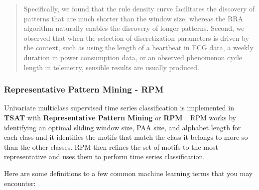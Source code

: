 \documentclass[letterpaper, 12pt]{article}
\newcommand\TSAT{\textbf{TSAT}}
\begin{document}
\begin{quote}
	Specifically, we found that the rule density curve facilitates the discovery of patterns that are much shorter than the window size, whereas the RRA algorithm naturally enables the discovery of longer patterns. Second, we observed that when the selection of discretization parameters is driven by the context, such as using the length of a heartbeat in ECG data, a weekly duration in power consumption data, or an observed phenomenon cycle length in telemetry, sensible results are usually produced.
\end{quote}


\subsubsection{Representative Pattern Mining - RPM}
\label{RPMOverview}



Univariate multiclass supervised time series classification is implemented in {\TSAT} with \textbf{Representative Pattern Mining} or \textbf{RPM}~\cite{wang2016rpm}.  RPM works by identifying an optimal sliding window size, PAA size, and alphabet length for each class and it identifies the motifs that match the class it belongs to more so than the other classes.  RPM then refines the set of motifs to the most representative and uses them to perform time series classification.

Here are some definitions to a few common machine learning terms that you may encounter:
\end{document}

